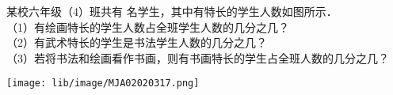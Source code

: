 某校六年级（4）班共有 名学生，其中有特长的学生人数如图所示．\\
（1）有绘画特长的学生人数占全班学生人数的几分之几？\\
（2）有武术特长的学生是书法学生人数的几分之几？\\
（3）若将书法和绘画看作书画，则有书画特长的学生占全班人数的几分之几？\\
\begin{center}
	\texttt{[image: lib/image/MJA02020317.png]}
	\vspace{0.5cm}
\end{center}
